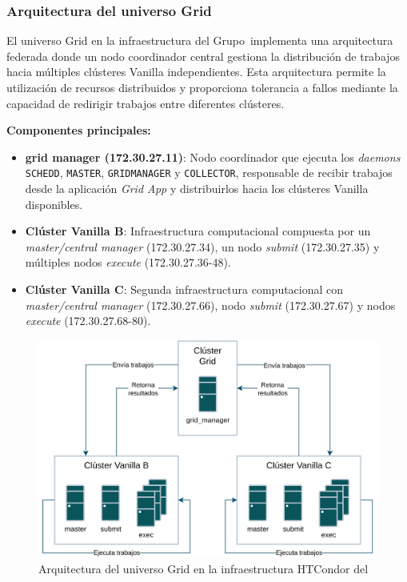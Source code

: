 \FloatBarrier\subsubsection{Arquitectura del universo Grid}

El universo Grid en la infraestructura del Grupo~\GRID implementa una arquitectura federada donde un nodo coordinador central gestiona la distribución de trabajos hacia múltiples clústeres Vanilla independientes. Esta arquitectura permite la utilización de recursos distribuidos y proporciona tolerancia a fallos mediante la capacidad de redirigir trabajos entre diferentes clústeres.

\textbf{Componentes principales:}

\begin{itemize}
	\item \textbf{grid manager (172.30.27.11)}: Nodo coordinador que ejecuta los \textit{daemons} \texttt{SCHEDD}, \texttt{MASTER}, \texttt{GRIDMANAGER} y \texttt{COLLECTOR}, responsable de recibir trabajos desde la aplicación \textit{Grid App} y distribuirlos hacia los clústeres Vanilla disponibles.
	
	\item \textbf{Clúster Vanilla B}: Infraestructura computacional compuesta por un \textit{master/central manager} (172.30.27.34), un nodo \textit{submit} (172.30.27.35) y múltiples nodos \textit{execute} (172.30.27.36-48).

	\item \textbf{Clúster Vanilla C}: Segunda infraestructura computacional con \textit{master/central manager} (172.30.27.66), nodo \textit{submit} (172.30.27.67) y nodos \textit{execute} (172.30.27.68-80).
\end{itemize}

\begin{figure}
	\centering
	\includegraphics[scale=0.11]{apendices/infra-virtual/Diagramas HTCondor-Grid-flow.drawio.png}
	\caption{Arquitectura del universo Grid en la infraestructura HTCondor del~\GRID}
	\label{fig:grid-architecture}
\end{figure}


